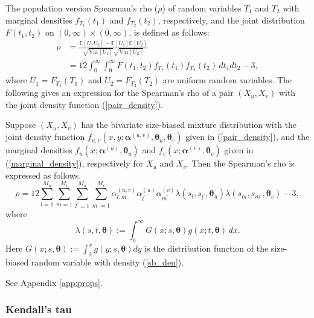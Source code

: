 \documentclass[eng]{csam}
\def\a{\alpha}
\def\mE{\mathbb{E}}
\def\mV{\text{Var}}
\begin{document}
The population version Spearman's rho ($\rho$) of random variables $T_1$ and $T_2$ with marginal densities $f_{T_1}(t_1)$ and $f_{T_2}(t_2)$, respectively, and the joint distribution $F(t_1, t_2)$ on $(0, \infty)\times (0, \infty)$, is defined as follows:
\begin{align}
\rho &= \frac{\mE[U_1 U_2] - \mE[U_1]\mE[U_2]}{\sqrt{\mV[U_1]}\sqrt{\mV[U_2]}} \nonumber\\
&= 12 \int_{0}^{\infty}\int_{0}^{\infty} F(t_1, t_2) f_{T_1}(t_1)f_{T_2}(t_2)\,dt_1 dt_2 -3, \label{def:rho}
\end{align}
where $U_1 = F_{T_1}(T_1)$ and $U_2 = F_{T_2}(T_2)$ are uniform random variables. The following gives an expression for the Spearman's rho of a pair $(X_u, X_v)$ with the joint density function (\ref{pair_density}).
\begin{proposition}\label{prop:rho}
Suppose $(X_u, X_v)$ has the bivariate size-biased mixture distribution with the joint density function $f_{u,v}(x, y; \bm{\a}^{(u,v)}, \bm{\theta}_u, \bm{\theta}_v)$ given in (\ref{pair_density}), and the marginal densities $f_u(x; \bm{\a}^{(u)}, \bm{\theta}_u)$ and $f_v(x; \bm{\a}^{(v)}, \bm{\theta}_v)$ given in (\ref{marginal_density}), respectively for $X_u$ and $X_v$. Then the Spearman's rho is expressed as follows.
\begin{equation}\label{rho_exp}
\rho = 12\sum_{l = 1}^{M_u}\sum_{m = 1}^{M_v} \sum_{l^\prime = 1}^{M_u}\sum_{m^\prime = 1}^{M_v} \a^{(u,v)}_{l,m} \a^{(u)}_{l^\prime}\a^{(v)}_{m^\prime} \lambda(s_l, s_{l^\prime}, \bm{\theta}_u)\lambda(s_m, s_{m^\prime}, \bm{\theta}_v) -3,
\end{equation}
where
\begin{equation*}
\lambda(s, t, \bm{\theta}) := \int_0^{\infty} G(x;s, \bm{\theta})g(x; t, \bm{\theta})\,dx.
\end{equation*}
Here $G(x;s, \bm{\theta}) := \int_0^x g(y; s, \bm{\theta})dy$ is the distribution function of the size-biased random variable with density (\ref{sb_den}).
\end{proposition}

 See Appendix \ref{app:props}.

\subsubsection{Kendall's tau}
\end{document}
